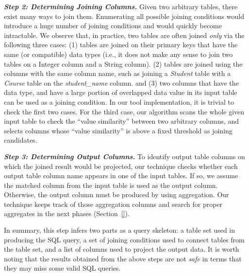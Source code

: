 \vspace{1mm}
\noindent\textit{\textbf{Step 2: Determining Joining Columns. }} Given two arbitrary tables, there exist many
ways to join them. Enumerating all possible joining conditions would introduce a huge number of joining
conditions and would quickly become intractable. We observe that, in practice, two tables are often joined \textit{only} via the following
three cases: (1) tables are joined on their primary keys that have the same (or compatible) data types (i.e., it does not
make any sense to join two tables on a Integer column and a String column). (2) tables are joined
using the columns with the same column name, such as joining a \textit{Student} table with a \textit{Course} table on the
\textit{student\_name} column. and (3) two columns that have the data type, and have a large portion of
overlapped data value in its input table can be used as a joining condition. In our tool implementation, it is trivial to check the first 
two cases. For the third case, our algorithm scans the whole given input table to check the ``value similarity''
between two arbitrary columns, and selects columns whose ``value similarity'' is above a fixed threshold as joining candidates.

\vspace{1mm}
\noindent \textit{\textbf{Step 3: Determining Output Columns.}} To identify output table columns on
which the joined result would be projected, our technique checks whether each output
table column name appears in one of the input tables. If so, we assume the matched column
from the input table is used as the output column. Otherwise, the output column
must be produced by using aggregation. Our technique keeps track of those aggregation columns
and search for proper aggregates in the next phases (Section~\ref{}). 


\vspace{1mm}

In summary, this step infers two parts as a query skeleton: a table set used in producing the SQL query, a set of joining conditions
used to connect tables from the table set, and a list of columns used to project the output data.
It is worth noting that the results obtained from the above steps are not \textit{safe} in
terms that they may miss some valid SQL queries. 

